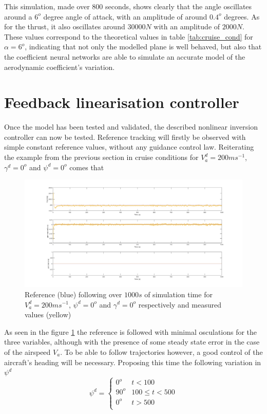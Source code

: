 This simulation, made over 800 seconds, shows clearly that the angle oscillates around a $6^o$ degree angle of attack, with an amplitude of around $0.4^o$ degrees. As for the thrust, it also oscillates around $30000N$ with an amplitude of $2000N$. These values correspond to the theoretical values in table \ref{tab:cruise_cond} for $\alpha=6^o$, indicating that not only the modelled plane is well behaved, but also that the coefficient neural networks are able to simulate an accurate model of the aerodynamic coefficient's variation.


\section{Feedback linearisation controller}
\label{section:results/fl_contro}

Once the model has been tested and validated, the described nonlinear inversion controller can now be tested. Reference tracking will firstly be observed with simple constant reference values, without any guidance control law. Reiterating the example from the previous section in cruise conditions for $V_a^d=200 ms^{-1}$, $\gamma^d = 0^o$ and $\psi^d = 0^o$ comes that
\begin{figure}[h]
\centering
\includegraphics[width=\textwidth]{Figures/Results/nli_test_const.png}
\caption[Constant reference following of feedback linearisation controller]{Reference (blue) following over $1000s$ of simulation time for $V_a^d=200 ms^{-1}$, $\psi^d = 0^o$ and $\gamma^d = 0^o$ respectively and measured values (yellow)}
\label{fig:const_ref}
\end{figure}

As seen in the figure \ref{fig:const_ref} the reference is followed with minimal osculations for the three variables, although with the presence of some steady state error in the case of the airspeed $V_a$. To be able to follow trajectories however, a good control of the aircraft's heading will be necessary. Proposing this time the following variation in $\psi^d$
\begin{equation}
\psi^d = \begin{cases}
0^o & t < 100\\
90^o & 100 \leq t < 500\\
0^o & t > 500 \\
\end{cases}
\label{eq:test_traj}
\end{equation}

